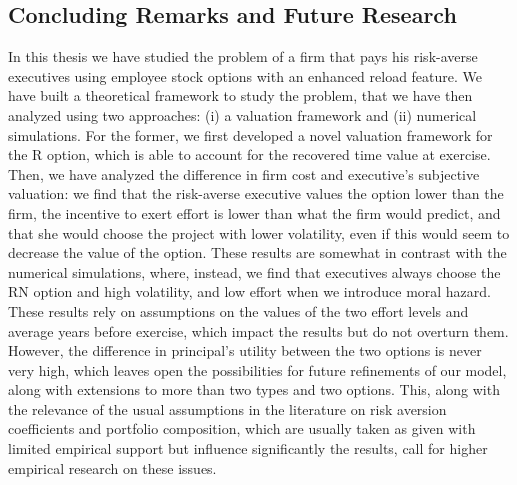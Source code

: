\subsection{Concluding Remarks and Future Research}
In this thesis we have studied the problem of a firm that pays his risk-averse executives using employee stock options with an enhanced reload feature. We have built a theoretical framework to study the problem, that we have then analyzed using two approaches: (i) a valuation framework and (ii) numerical simulations. 
For the former, we first developed a novel valuation framework for the R option, which is able to account for the recovered time value at exercise. Then, we have analyzed the difference in firm cost and executive's subjective valuation: we find that the risk-averse executive values the option lower than the firm, the incentive to exert effort is lower than what the firm would predict, and that she would choose the project with lower volatility, even if this would seem to decrease the value of the option.
These results are somewhat in contrast with the numerical simulations, where, instead, we find that executives always choose the RN option and high volatility, and low effort when we introduce moral hazard. These results rely on assumptions on the values of the two effort levels and average years before exercise, which impact the results but do not overturn them. However, the difference in principal's utility between the two options is never very high, which leaves open the possibilities for future refinements of our model, along with extensions to more than two types and two options. 
This, along with the relevance of the usual assumptions in the literature on risk aversion coefficients and portfolio composition, which are usually taken as given with limited empirical support but influence significantly the results, call for higher empirical research on these issues.